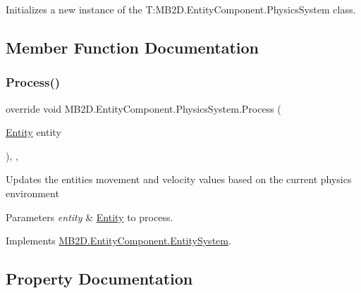 Initializes a new instance of the T\+:\+M\+B2\+D.\+Entity\+Component.\+Physics\+System class. 



\subsection{Member Function Documentation}
\hypertarget{class_m_b2_d_1_1_entity_component_1_1_physics_system_ab8398d3b16f49e684f55649877f645c0}{}\label{class_m_b2_d_1_1_entity_component_1_1_physics_system_ab8398d3b16f49e684f55649877f645c0} 
\subsubsection{\texorpdfstring{Process()}{Process()}}
{\footnotesize\ttfamily override void M\+B2\+D.\+Entity\+Component.\+Physics\+System.\+Process (\begin{DoxyParamCaption}\item[{\hyperlink{class_m_b2_d_1_1_entity_component_1_1_entity}{Entity}}]{entity }\end{DoxyParamCaption})\hspace{0.3cm}{\ttfamily [inline]}, {\ttfamily [protected]}, {\ttfamily [virtual]}}



Updates the entities movement and velocity values based on the current physics environment 


\begin{DoxyParams}{Parameters}
{\em entity} & \hyperlink{class_m_b2_d_1_1_entity_component_1_1_entity}{Entity} to process.\\
\hline
\end{DoxyParams}


Implements \hyperlink{class_m_b2_d_1_1_entity_component_1_1_entity_system_abbf83b87cb5d12754fb058cef50451fa}{M\+B2\+D.\+Entity\+Component.\+Entity\+System}.



\subsection{Property Documentation}
\hypertarget{class_m_b2_d_1_1_entity_component_1_1_physics_system_aa3340a463c0cc2dd1c765c350352c213}{}\label{class_m_b2_d_1_1_entity_component_1_1_physics_system_aa3340a463c0cc2dd1c765c350352c213} 
